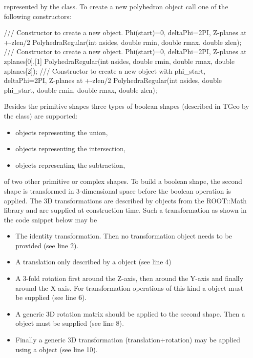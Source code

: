 \documentclass[10pt,a4paper]{article}
\begin{document}
\begin{itemize}
    represented by the  class. To create a new polyhedron
    object call one of the following constructors:
\begin{code}
/// Constructor to create a new object. Phi(start)=0, deltaPhi=2PI, Z-planes at +-zlen/2
PolyhedraRegular(int nsides, double rmin, double rmax, double zlen);
/// Constructor to create a new object. Phi(start)=0, deltaPhi=2PI, Z-planes at zplanes[0],[1]
PolyhedraRegular(int nsides, double rmin, double rmax, double zplanes[2]);
/// Constructor to create a new object with phi_start, deltaPhi=2PI, Z-planes at +-zlen/2
PolyhedraRegular(int nsides, double phi_start, double rmin, double rmax, double zlen);
\end{code}
\end{itemize}

\noindent
Besides the primitive shapes three types of boolean shapes (described in TGeo by the
 class)
are supported:

\begin{itemize}\itemcompact
\item {} objects representing the union,
\item {} objects representing the intersection,
\item {} objects representing the subtraction,
\end{itemize}

\noindent
of two other primitive or complex shapes. To build a boolean shape, the 
second shape is transformed in 3-dimensional space before the boolean 
operation is applied. The 3D transformations are described by objects from the 
ROOT::Math library and are supplied at construction time. 
Such a transformation as shown in the code snippet below may be 

\begin{itemize}\itemcompact
\item The identity transformation. Then no transformation object needs to be provided (see line 2).

\item A translation only described by a  object (see line 4)

\item A 3-fold rotation first around the Z-axis, then around the Y-axis and finally around the X-axis.
       For transformation operations of this kind a  object must be supplied (see line 6).

\item A generic 3D rotation matrix should be applied to the second shape. Then a 
       object must be supplied (see line 8).

\item Finally a generic 3D transformation (translation+rotation) may be applied using a 
        object (see line 10).
\end{itemize}
\end{document}
